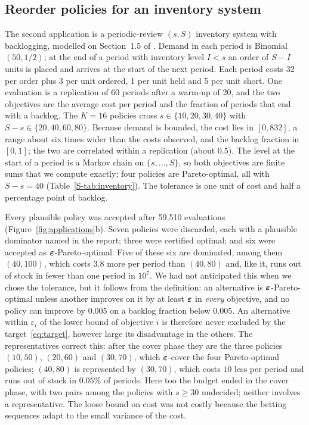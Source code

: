 \subsection{Reorder policies for an inventory system}\label{sec:app-inventory}

The second application is a periodic-review $(s,S)$ inventory system with backlogging, modelled on Section~1.5 of \citet{law2015}. Demand in each period is Binomial$(50,1/2)$; at the end of a period with inventory level $I<s$ an order of $S-I$ units is placed and arrives at the start of the next period. Each period costs 32 per order plus 3 per unit ordered, 1 per unit held and 5 per unit short. One evaluation is a replication of 60 periods after a warm-up of 20, and the two objectives are the average cost per period and the fraction of periods that end with a backlog. The $K=16$ policies cross $s\in\{10,20,30,40\}$ with $S-s\in\{20,40,60,80\}$. Because demand is bounded, the cost lies in $[0,832]$, a range about six times wider than the costs observed, and the backlog fraction in $[0,1]$; the two are correlated within a replication (about $0.5$). The level at the start of a period is a Markov chain on $\{s,\dots,S\}$, so both objectives are finite sums that we compute exactly; four policies are Pareto-optimal, all with $S-s=40$ (Table~\ref{S-tab:inventory}). The tolerance is one unit of cost and half a percentage point of backlog.

Every plausible policy was accepted after 59{,}510 evaluations (Figure~\ref{fig:applications}b). Seven policies were discarded, each with a plausible dominator named in the report; three were certified optimal; and six were accepted as $\bm{\varepsilon}$-Pareto-optimal. Five of these six are dominated, among them $(40,100)$, which costs $3.8$ more per period than $(40,80)$ and, like it, runs out of stock in fewer than one period in $10^7$. We had not anticipated this when we chose the tolerance, but it follows from the definition: an alternative is $\bm{\varepsilon}$-Pareto-optimal unless another improves on it by at least $\bm{\varepsilon}$ in \emph{every} objective, and no policy can improve by $0.005$ on a backlog fraction below $0.005$. An alternative within $\varepsilon_i$ of the lower bound of objective $i$ is therefore never excluded by the target~\eqref{eq:target}, however large its disadvantage in the others. The representatives correct this: after the cover phase they are the three policies $(10,50)$, $(20,60)$ and $(30,70)$, which $\bm{\varepsilon}$-cover the four Pareto-optimal policies; $(40,80)$ is represented by $(30,70)$, which costs $10$ less per period and runs out of stock in $0.05\%$ of periods. Here too the budget ended in the cover phase, with two pairs among the policies with $s\ge30$ undecided; neither involves a representative. The loose bound on cost was not costly because the betting sequences adapt to the small variance of the cost.


